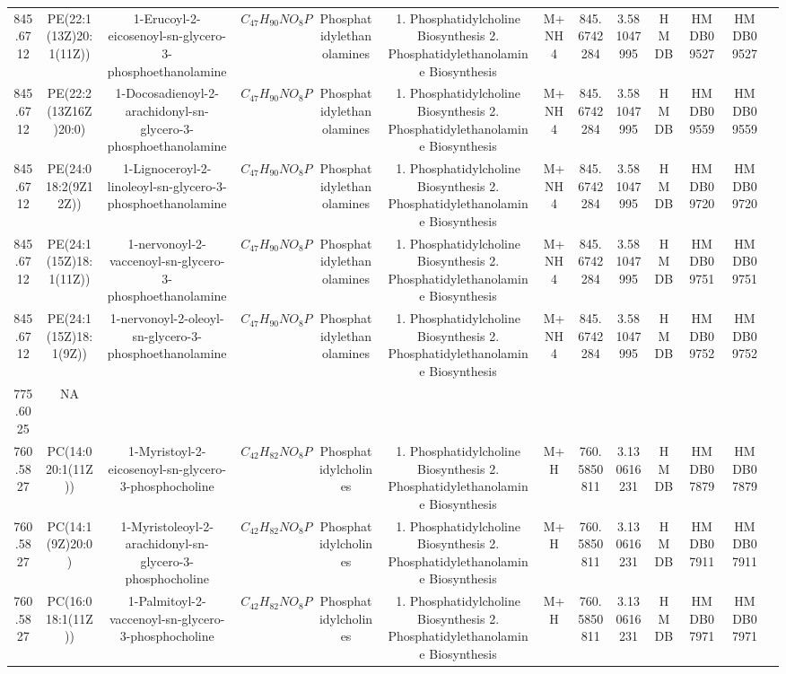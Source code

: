 \documentclass{WileyMSP-template}
\begin{document}
\begin{landscape}
\begin{table}
\begin{adjustbox}{center}
{\begin{tabular}{|c|c|c|c|c|c|c|c|c|c|c|c|c|}
            845.6712 & PE(22:1(13Z)20:1(11Z)) & 1-Erucoyl-2-eicosenoyl-sn-glycero-3-phosphoethanolamine & $ C_{47}H_{90}NO_{8}P $ & Phosphatidylethanolamines & 1. Phosphatidylcholine Biosynthesis 2. Phosphatidylethanolamine Biosynthesis & M+NH4 & 845.6742284 & 3.581047995 & HMDB & HMDB09527 & HMDB09527\\
            845.6712 & PE(22:2(13Z16Z)20:0) & 1-Docosadienoyl-2-arachidonyl-sn-glycero-3-phosphoethanolamine & $ C_{47}H_{90}NO_{8}P $ & Phosphatidylethanolamines & 1. Phosphatidylcholine Biosynthesis 2. Phosphatidylethanolamine Biosynthesis & M+NH4 & 845.6742284 & 3.581047995 & HMDB & HMDB09559 & HMDB09559\\
            845.6712 & PE(24:018:2(9Z12Z)) & 1-Lignoceroyl-2-linoleoyl-sn-glycero-3-phosphoethanolamine & $ C_{47}H_{90}NO_{8}P $ & Phosphatidylethanolamines & 1. Phosphatidylcholine Biosynthesis 2. Phosphatidylethanolamine Biosynthesis & M+NH4 & 845.6742284 & 3.581047995 & HMDB & HMDB09720 & HMDB09720\\
            845.6712 & PE(24:1(15Z)18:1(11Z)) & 1-nervonoyl-2-vaccenoyl-sn-glycero-3-phosphoethanolamine & $ C_{47}H_{90}NO_{8}P $ & Phosphatidylethanolamines & 1. Phosphatidylcholine Biosynthesis 2. Phosphatidylethanolamine Biosynthesis & M+NH4 & 845.6742284 & 3.581047995 & HMDB & HMDB09751 & HMDB09751\\
            845.6712 & PE(24:1(15Z)18:1(9Z)) & 1-nervonoyl-2-oleoyl-sn-glycero-3-phosphoethanolamine & $ C_{47}H_{90}NO_{8}P $ & Phosphatidylethanolamines & 1. Phosphatidylcholine Biosynthesis 2. Phosphatidylethanolamine Biosynthesis & M+NH4 & 845.6742284 & 3.581047995 & HMDB & HMDB09752 & HMDB09752\\
            \bottomrule
            775.6025 & NA &  &  &  &  &  &  &  &  &  & \\
            \bottomrule
            760.5827 & PC(14:020:1(11Z)) & 1-Myristoyl-2-eicosenoyl-sn-glycero-3-phosphocholine & $ C_{42}H_{82}NO_{8}P $ & Phosphatidylcholines & 1. Phosphatidylcholine Biosynthesis 2. Phosphatidylethanolamine Biosynthesis & M+H & 760.5850811 & 3.130616231 & HMDB & HMDB07879 & HMDB07879\\
            760.5827 & PC(14:1(9Z)20:0) & 1-Myristoleoyl-2-arachidonyl-sn-glycero-3-phosphocholine & $ C_{42}H_{82}NO_{8}P $ & Phosphatidylcholines & 1. Phosphatidylcholine Biosynthesis 2. Phosphatidylethanolamine Biosynthesis & M+H & 760.5850811 & 3.130616231 & HMDB & HMDB07911 & HMDB07911\\
            760.5827 & PC(16:018:1(11Z)) & 1-Palmitoyl-2-vaccenoyl-sn-glycero-3-phosphocholine & $ C_{42}H_{82}NO_{8}P $ & Phosphatidylcholines & 1. Phosphatidylcholine Biosynthesis 2. Phosphatidylethanolamine Biosynthesis & M+H & 760.5850811 & 3.130616231 & HMDB & HMDB07971 & HMDB07971\\

\end{tabular}}
\end{adjustbox}
\end{table}
\end{landscape}
\end{document}
